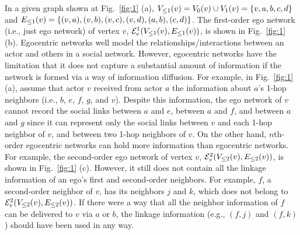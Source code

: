 In a given graph shown at Fig.~\ref{fig:1} (a), $\LV{v}{1} = \V{v}{0} \cup \V{v}{1} = \{v, a, b, c, d\}$ and $\LE{v}{1}=\{(v, a), (v, b), (v, c), (v, d), (a, b), (c, d) \}$. The first-order ego network (i.e., just ego network) of vertex $v$, $\ENN{v}{1}(\LV{v}{1}, \LE{v}{1})$, is shown in Fig.~\ref{fig:1} (b).
Egocentric networks well model the relationships/interactions between an actor and others in a social network.
However, egocentric networks have the limitation that it does not capture a substantial amount of information if the network is formed via a way of information diffusion.
For example, in Fig.~\ref{fig:1} (a), assume that actor $v$ received from actor $a$ the information about $a$'s 1-hop neighbors (i.e., $b$, $e$, $f$, $g$, and $v$).
Despite this information, the ego network of $v$ cannot record the social links between $a$ and $e$, between $a$ and $f$, and between $a$ and $g$ since it can represent only the social links between $v$ and each 1-hop neighbor of $v$, and between two 1-hop neighbors of $v$.
On the other hand, $n$th-order egocentric networks can hold more information than egocentric networks.
For example, the second-order ego network of vertex $v$, $\ENN{v}{2} (\LV{v}{2}, \LE{v}{2})$, is shown in Fig.~\ref{fig:1} (c).
However, it still does not contain all the linkage information of an ego's first and second-order neighbors.
For example, $f$, a second-order neighbor of $v$, has its neighbors $j$ and $k$, which does not belong to $\ENN{v}{2} (\LV{v}{2}, \LE{v}{2})$. 
If there were a way that all the neighbor information of $f$ can be delivered to $v$ via $a$ or $b$, the linkage information (e.g., $(f, j)$ and $(f, k)$) should have been used in any way. 

